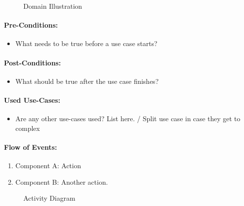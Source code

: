 \begin{figure} [htb]
	\centering
	\caption{Domain Illustration}
	\label{fig:domain template}
\end{figure}


\paragraph{Pre-Conditions:}
\begin{itemize}
	\item What needs to be true before a use case starts?
\end{itemize}

\paragraph{Post-Conditions:}
\begin{itemize}
	\item What should be true after the use case finishes?
\end{itemize}



\paragraph{Used Use-Cases:}
\begin{itemize}
	\item Are any other use-cases used? List here. / Split use case in case they get to complex
\end{itemize}


\paragraph{Flow of Events:}
\begin{enumerate}
	\item Component A: Action
	\item Component B: Another action.
\end{enumerate}


\begin{figure} [htb]
	\centering
	\caption{Activity Diagram}
	\label{fig:activity template}
\end{figure}

